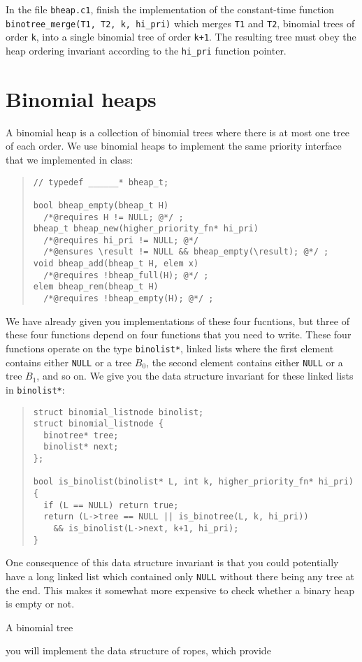 \documentclass[12pt]{exam}
\begin{document}
\begin{task}[3]
  In the file \lstinline'bheap.c1', finish the implementation of the
  constant-time function \lstinline'binotree_merge(T1, T2, k, hi_pri)'
  which merges \lstinline'T1' and \lstinline'T2', binomial trees of
  order \lstinline'k', into a single binomial tree of order
  \lstinline'k+1'. The resulting tree must obey the heap ordering
  invariant according to the \lstinline'hi_pri' function pointer.
\end{task}

\section{Binomial heaps}

A binomial heap is a collection of binomial trees where there is at
most one tree of each order. We use binomial heaps to implement the
same priority interface that we implemented in class:

\begin{quote}
\begin{lstlisting}
// typedef ______* bheap_t;

bool bheap_empty(bheap_t H)
  /*@requires H != NULL; @*/ ;
bheap_t bheap_new(higher_priority_fn* hi_pri)
  /*@requires hi_pri != NULL; @*/
  /*@ensures \result != NULL && bheap_empty(\result); @*/ ;
void bheap_add(bheap_t H, elem x)
  /*@requires !bheap_full(H); @*/ ;
elem bheap_rem(bheap_t H)
  /*@requires !bheap_empty(H); @*/ ;
\end{lstlisting}
\end{quote}

We have already given you implementations of these four fucntions, but
three of these four functions depend on four functions that you need
to write. These four functions operate on the type
\lstinline'binolist*', linked lists where the first element contains
either \lstinline'NULL' or a tree $B_0$, the second element contains
either \lstinline'NULL' or a tree $B_1$, and so on. We give you the
data structure invariant for these linked lists in
\lstinline'binolist*':

\begin{quote}
\begin{lstlisting}[numbers=none]
struct binomial_listnode binolist;
struct binomial_listnode {
  binotree* tree;
  binolist* next;
};

bool is_binolist(binolist* L, int k, higher_priority_fn* hi_pri) {
  if (L == NULL) return true;
  return (L->tree == NULL || is_binotree(L, k, hi_pri))
    && is_binolist(L->next, k+1, hi_pri);
}
\end{lstlisting}
\end{quote}

One consequence of this data structure invariant is that you could
potentially have a long linked list which contained only
\lstinline'NULL' without there being any tree at the end. This makes
it somewhat more expensive to check whether a binary heap is empty or
not.

A binomial tree


you will
implement the data structure of ropes, which provide
\end{document}
